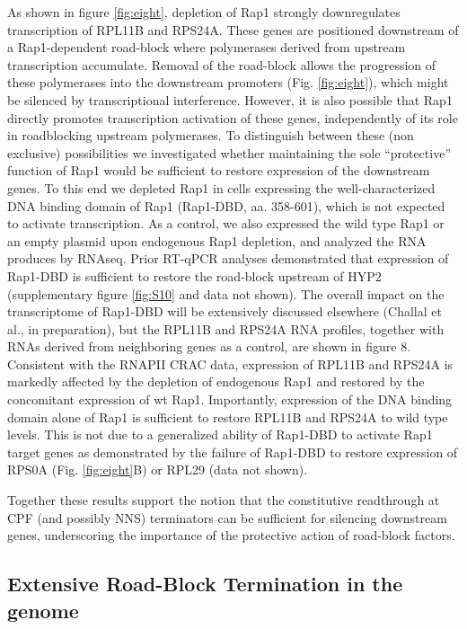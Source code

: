 As shown in figure \ref{fig:eight}, depletion of Rap1 strongly downregulates transcription of RPL11B and RPS24A. These genes are positioned downstream of a Rap1-dependent road-block where polymerases derived from upstream transcription accumulate. Removal of the road-block allows the progression of these polymerases into the downstream promoters (Fig. \ref{fig:eight}), which  might be silenced by transcriptional interference. However, it is also possible that Rap1 directly promotes transcription activation of these genes, independently of its role in roadblocking upstream polymerases. To distinguish between these (non exclusive) possibilities we investigated whether maintaining the sole “protective” function of Rap1 would be sufficient to restore expression of the downstream genes. To this end we depleted Rap1 in cells expressing the well-characterized DNA binding domain of Rap1 (Rap1-DBD, aa. 358-601), which is not expected to activate transcription. As a control, we also expressed the wild type Rap1 or an empty plasmid upon endogenous Rap1 depletion, and analyzed the RNA produces by RNAseq. Prior RT-qPCR analyses demonstrated that expression of Rap1-DBD is sufficient to restore the road-block upstream of HYP2 (supplementary figure \ref{fig:S10} and data not shown). The overall impact on the transcriptome of Rap1-DBD will be extensively discussed elsewhere (Challal et al., in preparation), but the RPL11B and RPS24A RNA profiles, together with RNAs derived from neighboring genes as a control, are shown in figure 8. Consistent with the RNAPII CRAC data, expression of RPL11B and RPS24A is markedly affected by the depletion of endogenous Rap1 and restored by the concomitant expression of wt Rap1. Importantly, expression of the DNA binding domain alone of Rap1 is sufficient to restore RPL11B and RPS24A to wild type levels. This is not due to a generalized ability of Rap1-DBD to activate Rap1 target genes as demonstrated by the failure of Rap1-DBD to restore expression of RPS0A (Fig. \ref{fig:eight}B) or RPL29 (data not shown).


Together these results support the notion that the constitutive readthrough at CPF (and possibly NNS) terminators can be sufficient for silencing downstream genes, underscoring the importance of the protective action of road-block factors.  

\singlespacing
\subsection*{Extensive Road-Block Termination in the \cer{} genome}
\doublespacing




